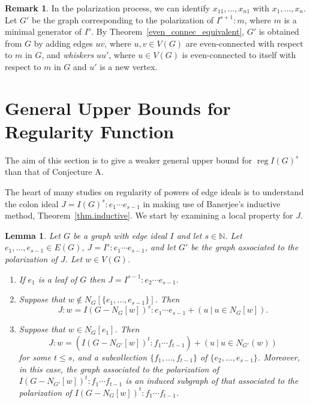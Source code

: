 \documentclass[10pt]{amsart}
\newtheorem{lemm}[theo]{Lemma}
\theoremstyle{definition}
\newtheorem{rema}[theo]{Remark}
\DeclareMathOperator{\reg}{reg}
\newcommand{\NN}{{\mathbb N}}
\begin{document}
\begin{rema} \label{rmk.G'}
	In the polarization process, we can identify $x_{11}, \ldots, x_{n1}$ with $x_1, \ldots, x_n$. Let $G'$ be the graph corresponding to the polarization of $I^{s+1}:m$, where $m$ is a minimal generator of $I^s$. By Theorem~\ref{even_connec_equivalent}, $G'$ is obtained from $G$ by adding edges $uv$, where $u,v \in V(G)$ are even-connected with respect to $m$ in $G$, and \emph{whiskers} $uu'$, where $u \in V(G)$ is even-connected to itself with respect to $m$ in $G$ and $u'$ is a new vertex.
\end{rema}



\section{General Upper Bounds for Regularity Function} \label{chapter3}

The aim of this section is to give a weaker general upper bound for $\reg I(G)^s$ than that of Conjecture A.

The heart of many studies on regularity of powers of edge ideals is to understand the colon ideal $J = I(G)^s : e_1 \cdots e_{s-1}$ in making use of Banerjee's inductive method, Theorem~\ref{thm.inductive}. We start by examining a local property for $J$.

\begin{lemm} \label{lem.induction}
Let $G$ be a graph with edge ideal $I$ and let $s \in \NN$. Let $e_1, \dots, e_{s-1} \in E(G)$, $J = I^s : e_1 \cdots e_{s-1}$, and let $G'$ be the graph associated to the polarization of $J$. Let $w \in V(G)$.
\begin{enumerate}
\item\label{lemma3.1_1} If $e_1$ is a leaf of $G$ then $J = I^{s-1} : e_2 \cdots e_{s-1}$.
\item\label{lemma3.1_2} Suppose that $w \not\in N_G[\{e_1, \dots, e_{s-1}\}]$. Then
\[
J:w = I(G - N_G[w])^s : e_1 \cdots e_{s-1} + (u ~\big|~ u \in N_G[w]).
\]

\item\label{lemma3.1_3} Suppose that $w \in N_G[e_1]$. Then
\[
J:w = (I(G - N_{G'}[w])^t : f_1 \cdots f_{t-1}) + (u ~\big|~ u \in N_{G'}(w))
\]
for some $t \le s$, and a subcollection $\{f_1, \dots, f_{t-1}\}$ of $\{e_2, \dots, e_{s-1}\}$. Moreover, in this case, the graph associated to the polarization of $I(G-N_{G'}[w])^t : f_1 \cdots f_{t-1}$ is an induced subgraph of that associated to the polarization of $I(G-N_G[w])^t : f_1 \cdots f_{t-1}$.
\end{enumerate}
\end{lemm}
\end{document}

